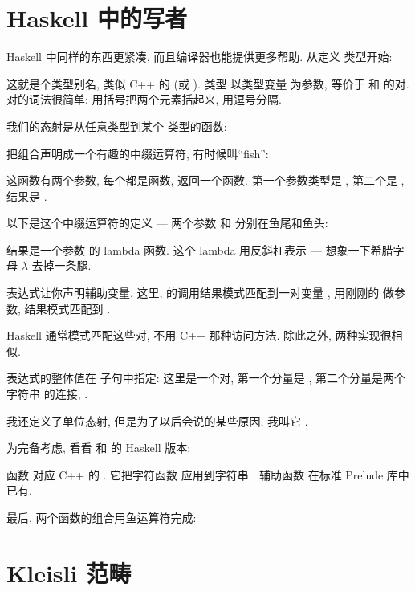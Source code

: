 \section{Haskell 中的写者}

Haskell 中同样的东西更紧凑, 而且编译器也能提供更多帮助. 从定义  类型开始:

这就是个类型别名, 类似 C++ 的  (或 ). 类型  以类型变量 
为参数, 等价于  和  的对. 对的词法很简单: 用括号把两个元素括起来, 用逗号分隔.

我们的态射是从任意类型到某个  类型的函数:

把组合声明成一个有趣的中缀运算符, 有时候叫``fish'':

这函数有两个参数, 每个都是函数, 返回一个函数. 第一个参数类型是 , 第二个是
, 结果是 .

以下是这个中缀运算符的定义 --- 两个参数  和  分别在鱼尾和鱼头:

结果是一个参数  的 lambda 函数. 这个 lambda 用反斜杠表示 --- 想象一下希腊字母 $\lambda$ 去掉一条腿.

 表达式让你声明辅助变量. 这里,  的调用结果模式匹配到一对变量 ,
 用刚刚的  做参数, 结果模式匹配到 .

Haskell 通常模式匹配这些对, 不用 C++ 那种访问方法. 除此之外, 两种实现很相似.

 表达式的整体值在  子句中指定: 这里是一个对, 第一个分量是 , 第二个分量是两个字符串
的连接, .

我还定义了单位态射, 但是为了以后会说的某些原因, 我叫它 .

为完备考虑, 看看  和  的 Haskell 版本:

函数  对应 C++ 的 . 它把字符函数  应用到字符串 .
辅助函数  在标准 Prelude 库中已有.

最后, 两个函数的组合用鱼运算符完成:


\section{Kleisli 范畴}

